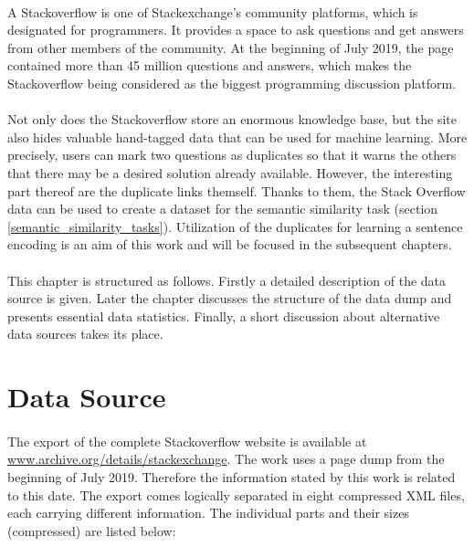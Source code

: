 \paragraph{}
A Stackoverflow is one of Stackexchange's community platforms, which is designated for programmers. It provides a space to ask questions and get answers from other members of the community. At the beginning of July 2019, the page contained more than 45 million questions and answers, which makes the Stackoverflow being considered as the biggest programming discussion platform.

\paragraph{}
Not only does the Stackoverflow store an enormous knowledge base, but the site also hides valuable hand-tagged data that can be used for machine learning. More precisely, users can mark two questions as duplicates so that it warns the others that there may be a desired solution already available. However, the interesting part thereof are the duplicate links themself. Thanks to them, the Stack Overflow data can be used to create a dataset for the semantic similarity task (section \ref{semantic_similarity_tasks}). Utilization of the duplicates for learning a sentence encoding is an aim of this work and will be focused in the subsequent chapters.

\paragraph{}
This chapter is structured as follows. Firstly a detailed description of the data source is given. Later the chapter discusses the structure of the data dump and presents essential data statistics. Finally, a short discussion about alternative data sources takes its place.  

\section{Data Source}
\paragraph{}

The export of the complete Stackoverflow website is available at \url{www.archive.org/details/stackexchange}. The work uses a page dump from the beginning of July 2019. Therefore the information stated by this work is related to this date. The export comes logically separated in eight compressed XML files, each carrying different information. The individual parts and their sizes (compressed) are listed below:

